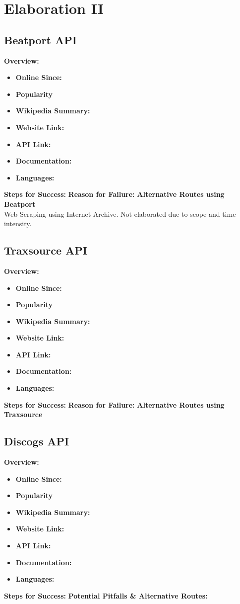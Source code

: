 \documentclass{article}
\begin{document}
\section{Elaboration II}
\subsection{Beatport API}
\textbf{Overview:}
\begin{itemize}
    \item \textbf{Online Since:}
    \item \textbf{Popularity}
    \item \textbf{Wikipedia Summary:}
    \item \textbf{Website Link:}
    \item \textbf{API Link:}
    \item \textbf{Documentation:}
    \item \textbf{Languages:}
\end{itemize}
\textbf{Steps for Success:}
\textbf{Reason for Failure:}
\textbf{Alternative Routes using Beatport}\\
Web Scraping using Internet Archive. Not elaborated due to scope and time intensity.

\subsection{Traxsource API}
\textbf{Overview:}
\begin{itemize}
    \item \textbf{Online Since:}
    \item \textbf{Popularity}
    \item \textbf{Wikipedia Summary:}
    \item \textbf{Website Link:}
    \item \textbf{API Link:}
    \item \textbf{Documentation:}
    \item \textbf{Languages:}
\end{itemize}
\textbf{Steps for Success:}
\textbf{Reason for Failure:}
\textbf{Alternative Routes using Traxsource}

\subsection{Discogs API}
\textbf{Overview:}
\begin{itemize}
    \item \textbf{Online Since:}
    \item \textbf{Popularity}
    \item \textbf{Wikipedia Summary:}
    \item \textbf{Website Link:}
    \item \textbf{API Link:}
    \item \textbf{Documentation:}
    \item \textbf{Languages:}
\end{itemize}
\textbf{Steps for Success:}
\textbf{Potential Pitfalls & Alternative Routes:}
\end{document}
